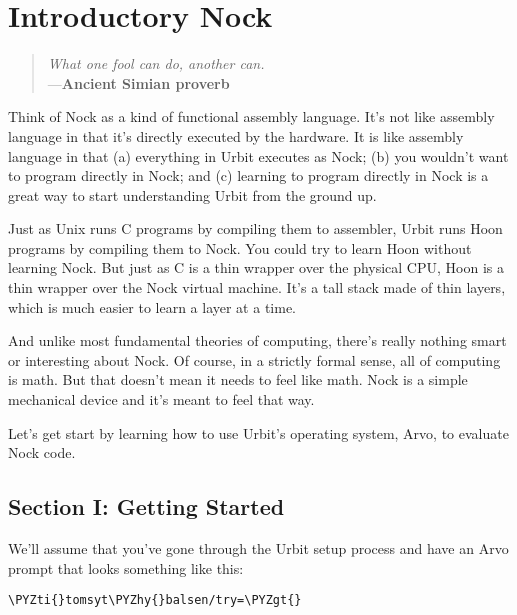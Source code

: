 \chapter{Introductory Nock}

\begin{quote}
\noindent \emph{What one fool can do, another can.}
\medskip \\
\noindent ---\textbf{Ancient Simian proverb}
\end{quote}

Think of Nock as a kind of functional assembly language.  It's not like
assembly language in that it's directly executed by the hardware.  It is like
assembly language in that (a) everything in Urbit executes as Nock; (b) you
wouldn't want to program directly in Nock; and (c) learning to program directly
in Nock is a great way to start understanding Urbit from the ground up.

Just as Unix runs C programs by compiling them to assembler, Urbit runs Hoon
programs by compiling them to Nock.  You could try to learn Hoon without
learning Nock.  But just as C is a thin wrapper over the physical CPU, Hoon is
a thin wrapper over the Nock virtual machine.  It's a tall stack made of thin
layers, which is much easier to learn a layer at a time.

And unlike most fundamental theories of computing, there's really nothing smart
or interesting about Nock.  Of course, in a strictly formal sense, all of
computing is math.  But that doesn't mean it needs to feel like math.  Nock is
a simple mechanical device and it's meant to feel that way.

Let's get start by learning how to use Urbit's operating system, Arvo, to
evaluate Nock code.

\section{Section I: Getting Started}

We'll assume that you've gone through the Urbit setup process and have an Arvo
prompt that looks something like this:

\begin{framed_shaded}
\begin{Verbatim}[fontsize=\relsize{-2.5},fontseries=b,commandchars=\\\{\}]
\PYZti{}tomsyt\PYZhy{}balsen/try=\PYZgt{} 
\end{Verbatim}
\end{framed_shaded}

